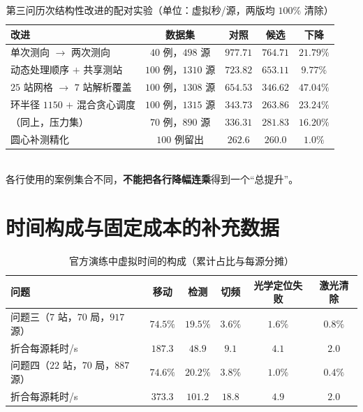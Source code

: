 \begin{appendices}
\begin{table}[!htbp]
  \caption{第三问历次结构性改进的配对实验（单位：虚拟秒/源，两版均 $100\%$ 清除）}\label{tab:q3paired}\centering
  \begin{tabular}{lcccc}
    \toprule[1.5pt]
    改进 & 数据集 & 对照 & 候选 & 下降 \\
    \midrule[1pt]
    单次测向 $\to$ 两次测向 & $40$ 例，$498$ 源 & $977.71$ & $764.71$ & $21.79\%$ \\
    动态处理顺序 $+$ 共享测站 & $100$ 例，$1310$ 源 & $723.82$ & $653.11$ & $9.77\%$ \\
    $25$ 站网格 $\to$ $7$ 站解析覆盖 & $100$ 例，$1308$ 源 & $654.53$ & $346.62$ & $47.04\%$ \\
    环半径 $1150$ $+$ 混合贪心调度 & $100$ 例，$1315$ 源 & $343.73$ & $263.86$ & $23.24\%$ \\
    （同上，压力集） & $70$ 例，$890$ 源 & $336.31$ & $281.83$ & $16.20\%$ \\
    圆心补测精化 & $100$ 例留出 & $262.6$ & $260.0$ & $1.0\%$ \\
    \bottomrule[1.5pt]
  \end{tabular}\\[2pt]
  \small 各行使用的案例集合不同，\textbf{不能把各行降幅连乘}得到一个“总提升”。
\end{table}

\section{时间构成与固定成本的补充数据}\label{app:fixed}

\begin{table}[!htbp]
  \caption{官方演练中虚拟时间的构成（累计占比与每源分摊）}\label{tab:breakdown}\centering
  \begin{tabular}{lccccc}
    \toprule[1.5pt]
    问题 & 移动 & 检测 & 切频 & 光学定位失败 & 激光清除 \\
    \midrule[1pt]
    问题三（$7$ 站，$70$ 局，$917$ 源） & $74.5\%$ & $19.5\%$ & $3.6\%$ & $1.6\%$ & $0.8\%$ \\
    \quad 折合每源耗时/s & $187.3$ & $48.9$ & $9.1$ & $4.1$ & $2.0$ \\
    问题四（$22$ 站，$70$ 局，$887$ 源） & $74.6\%$ & $20.2\%$ & $3.8\%$ & $1.0\%$ & $0.4\%$ \\
    \quad 折合每源耗时/s & $373.3$ & $101.2$ & $18.8$ & $4.9$ & $2.0$ \\
    \bottomrule[1.5pt]
  \end{tabular}
\end{table}


\end{appendices}
